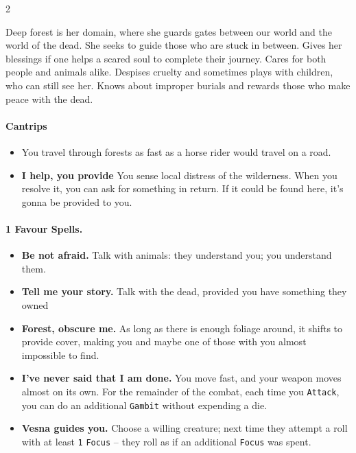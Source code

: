 

\begin{multicols*}{2}

Deep forest is her domain, where she guards gates between our world and the world of the dead.
She seeks to guide those who are stuck in between.
Gives her blessings if one helps a scared soul to complete their journey.
Cares for both people and animals alike.
Despises cruelty and sometimes plays with children, who can still see her.
Knows about improper burials and rewards those who make peace with the dead.


\paragraph{Cantrips}
\begin{itemize}[nosep, leftmargin=*]
    \item[\ding{108}] You travel through forests as fast as a horse rider would travel on a road.
    \item[\ding{108}] \textbf{I help, you provide} You sense local distress of the wilderness.
 When you resolve it, you can ask for something in return.
 If it could be found here, it's gonna be provided to you.
\end{itemize}

\paragraph{1 Favour Spells.}

\begin{itemize}[nosep, leftmargin=*]
    \item[\ding{108}] \textbf{Be not afraid.} Talk with animals: they understand you; you understand them.
    \item[\ding{108}] \textbf{Tell me your story.} Talk with the dead, provided you have something they owned
    \item[\ding{108}] \textbf{Forest, obscure me.} As long as there is enough foliage around, it shifts to provide cover, making you and maybe one of those with you almost impossible to find.
    \item[\ding{108}] \textbf{I've never said that I am done. } You move fast, and your weapon moves almost on its own. For the remainder of the combat, each time you \texttt{Attack}, you can do an additional \texttt{Gambit} without expending a die.
    \item[\ding{108}] \textbf{Vesna guides you. } Choose a willing creature; next time they attempt a roll with at least \texttt{1} \texttt{Focus} -- they roll as if an additional \texttt{Focus} was spent.
\end{itemize}


\end{multicols*}
